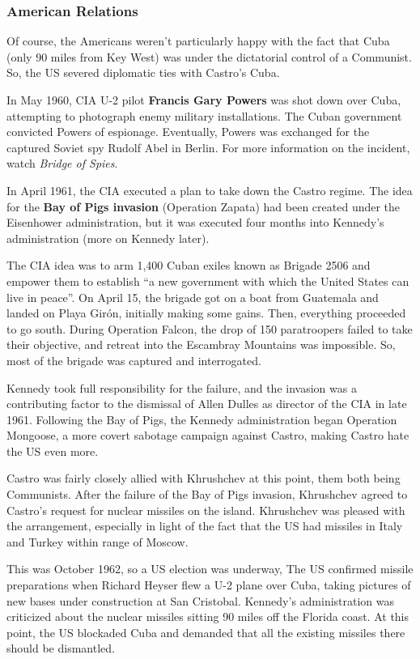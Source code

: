 \subsubsection*{American Relations}

Of course, the Americans weren't particularly happy with the fact that Cuba (only 90 miles from Key West)
was under the dictatorial control of a Communist.
So, the US severed diplomatic ties with Castro's Cuba.

In May 1960, CIA U-2 pilot \textbf{Francis Gary Powers} was shot down over Cuba,
attempting to photograph enemy military installations.
The Cuban government convicted Powers of espionage.
Eventually, Powers was exchanged for the captured Soviet spy Rudolf Abel in Berlin.
For more information on the incident, watch \textit{Bridge of Spies}.

In April 1961, the CIA executed a plan to take down the Castro regime.
The idea for the \textbf{Bay of Pigs invasion} (Operation Zapata)
had been created under the Eisenhower administration,
but it was executed four months into Kennedy's administration (more on Kennedy later).

The CIA idea was to arm 1,400 Cuban exiles known as Brigade 2506
and empower them to establish ``a new government with which the United States can live in peace''.
On April 15, the brigade got on a boat from Guatemala and landed on Playa Gir\'on, initially making some gains.
Then, everything proceeded to go south.
During Operation Falcon, the drop of 150 paratroopers failed to take their objective,
and retreat into the Escambray Mountains was impossible.
So, most of the brigade was captured and interrogated.

Kennedy took full responsibility for the failure,
and the invasion was a contributing factor to the dismissal of Allen Dulles as director of the CIA in late 1961.
Following the Bay of Pigs, the Kennedy administration began Operation Mongoose,
a more covert sabotage campaign against Castro, making Castro hate the US even more.

Castro was fairly closely allied with Khrushchev at this point, them both being Communists.
After the failure of the Bay of Pigs invasion,
Khrushchev agreed to Castro's request for nuclear missiles on the island.
Khrushchev was pleased with the arrangement,
especially in light of the fact that the US had missiles in Italy and Turkey within range of Moscow.

This was October 1962, so a US election was underway,
The US confirmed missile preparations when Richard Heyser flew a U-2 plane over Cuba,
taking pictures of new bases under construction at San Cristobal.
Kennedy's administration was criticized about the nuclear missiles sitting 90 miles off the Florida coast.
At this point, the US blockaded Cuba and demanded that all the existing missiles there should be dismantled.

